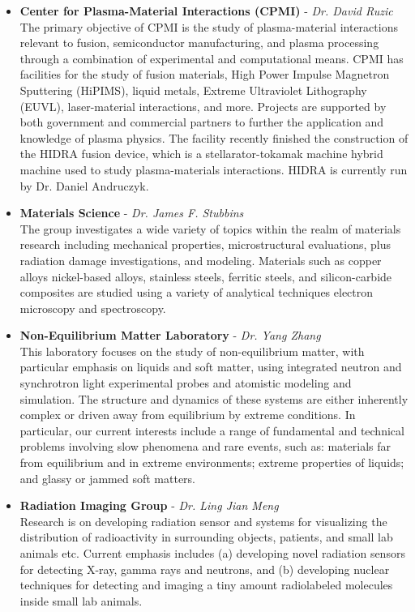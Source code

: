 \documentclass[11pt, letterpaper]{article}
\begin{document}
\begin{itemize}
  \item \textbf{Center for Plasma-Material Interactions (CPMI)} - \textit{Dr. David Ruzic}\\
  The primary objective of CPMI is the study of plasma-material interactions relevant to fusion, semiconductor manufacturing, and plasma processing through a combination of experimental and computational means. CPMI has facilities for the study of fusion materials, High Power Impulse Magnetron Sputtering (HiPIMS), liquid metals, Extreme Ultraviolet Lithography (EUVL),  laser-material interactions, and more. Projects are supported by both government and commercial partners to further the application and knowledge of plasma physics. The facility recently finished the construction of the HIDRA fusion device, which is a stellarator-tokamak machine hybrid machine used to study plasma-materials interactions.  HIDRA is currently run by Dr. Daniel Andruczyk.

  \item \textbf{Materials Science} - \textit{Dr. James F. Stubbins}\\
  The group investigates a wide variety of topics within the realm of materials research including mechanical properties, microstructural evaluations, plus radiation damage investigations, and modeling. Materials such as copper alloys nickel-based alloys, stainless steels, ferritic steels, and silicon-carbide composites are studied using a variety of analytical techniques electron microscopy and spectroscopy.


  \item \textbf{Non-Equilibrium Matter Laboratory} - \textit{Dr. Yang Zhang}\\
  This laboratory focuses on the study of non-equilibrium matter, with particular emphasis on liquids and soft matter, using integrated neutron and synchrotron light experimental probes and atomistic modeling and simulation. The structure and dynamics of these systems are either inherently complex or driven away from equilibrium by extreme conditions. In particular, our current interests include a range of fundamental and technical problems involving slow phenomena and rare events, such as: materials far from equilibrium and in extreme environments; extreme properties of liquids; and glassy or jammed soft matters.

  \item \textbf{Radiation Imaging Group} - \textit{Dr. Ling Jian Meng}\\
  Research is on developing radiation sensor and systems for visualizing the distribution of radioactivity in surrounding objects, patients, and small lab animals etc. Current emphasis includes (a) developing novel radiation sensors for detecting X-ray, gamma rays and neutrons, and (b) developing nuclear techniques for detecting and imaging a tiny amount radiolabeled molecules inside small lab animals.


\end{itemize}
\end{document}
